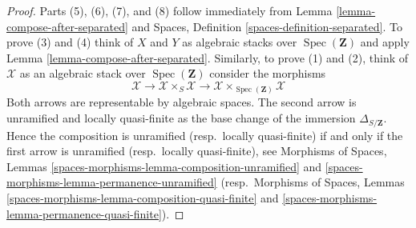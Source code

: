 \documentclass[10pt,a4paper]{amsart}
\theoremstyle{plain}
\theoremstyle{definition}
\theoremstyle{remark}
\numberwithin{equation}{subsection}
\def\Spec{\mathop{\mathrm{Spec}}}
\begin{document}
\begin{proof}
Parts (5), (6), (7), and (8) follow immediately from
Lemma \ref{lemma-compose-after-separated}
and
Spaces, Definition \ref{spaces-definition-separated}.
To prove (3) and (4) think of $X$ and $Y$ as algebraic stacks over
$\Spec(\mathbf{Z})$ and apply
Lemma \ref{lemma-compose-after-separated}.
Similarly, to prove (1) and (2), think of $\mathcal{X}$ as an algebraic
stack over $\Spec(\mathbf{Z})$ consider the
morphisms
$$
\mathcal{X} \longrightarrow
\mathcal{X} \times_S \mathcal{X} \longrightarrow
\mathcal{X} \times_{\Spec(\mathbf{Z})} \mathcal{X}
$$
Both arrows are representable by algebraic spaces.
The second arrow is unramified and locally quasi-finite as the base change of
the immersion $\Delta_{S/\mathbf{Z}}$. Hence the composition is
unramified (resp.\ locally quasi-finite) if and only if the first arrow
is unramified (resp.\ locally quasi-finite), see
Morphisms of Spaces,
Lemmas \ref{spaces-morphisms-lemma-composition-unramified} and
\ref{spaces-morphisms-lemma-permanence-unramified}
(resp.\ Morphisms of Spaces,
Lemmas \ref{spaces-morphisms-lemma-composition-quasi-finite} and
\ref{spaces-morphisms-lemma-permanence-quasi-finite}).
\end{proof}
\end{document}

